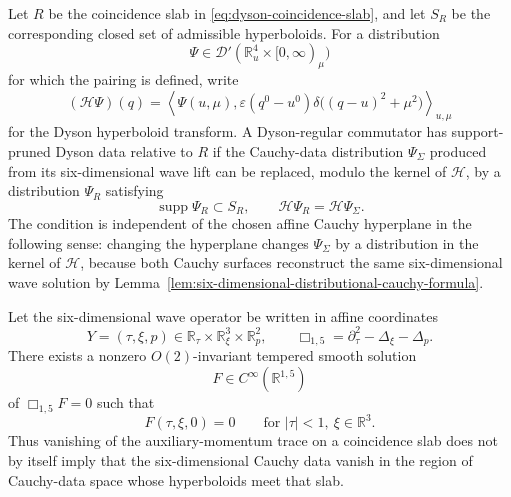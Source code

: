 \begin{definition}
\label{def:support-pruned-dyson-data}
Let \(R\) be the coincidence slab in
\eqref{eq:dyson-coincidence-slab}, and let \(S_R\) be the corresponding
closed set of admissible hyperboloids.  For a distribution
\[
  \Psi\in\mathcal D'(\mathbb R^4_u\times[0,\infty)_\mu)
\]
for which the pairing is defined, write
\begin{equation}
  (\mathcal H\Psi)(q)
  =
  \left\langle
    \Psi(u,\mu),
    \varepsilon(q^0-u^0)
    \delta\!\bigl((q-u)^2+\mu^2\bigr)
  \right\rangle_{u,\mu}
  \label{eq:dyson-hyperboloid-transform}
\end{equation}
for the Dyson hyperboloid transform.  A Dyson-regular commutator has
support-pruned Dyson data relative to \(R\) if the Cauchy-data distribution
\(\Psi_\Sigma\) produced from its six-dimensional wave lift can be replaced,
modulo the kernel of \(\mathcal H\), by a distribution \(\Psi_R\) satisfying
\begin{equation}
  \operatorname{supp}\Psi_R\subset S_R,
  \qquad
  \mathcal H\Psi_R=\mathcal H\Psi_\Sigma .
  \label{eq:support-pruned-dyson-data}
\end{equation}
The condition is independent of the chosen affine Cauchy hyperplane in the
following sense: changing the hyperplane changes \(\Psi_\Sigma\) by a
distribution in the kernel of \(\mathcal H\), because both Cauchy surfaces
reconstruct the same six-dimensional wave solution by
Lemma~\ref{lem:six-dimensional-distributional-cauchy-formula}.
\end{definition}

\begin{proposition}
\label{prop:dyson-axis-trace-nonuniqueness}
Let the six-dimensional wave operator be written in affine coordinates
\[
  Y=(\tau,\xi,p)\in\mathbb R_\tau\times\mathbb R^3_\xi\times\mathbb R^2_p,
  \qquad
  \Box_{1,5}=\partial_\tau^2-\Delta_\xi-\Delta_p .
\]
There exists a nonzero \(O(2)\)-invariant tempered smooth solution
\[
  F\in C^\infty(\mathbb R^{1,5})
\]
of \(\Box_{1,5}F=0\) such that
\begin{equation}
  F(\tau,\xi,0)=0
  \qquad
  \text{for } |\tau|<1,\ \xi\in\mathbb R^3 .
  \label{eq:axis-trace-vanishing-example}
\end{equation}
Thus vanishing of the auxiliary-momentum trace on a coincidence slab does not
by itself imply that the six-dimensional Cauchy data vanish in the region of
Cauchy-data space whose hyperboloids meet that slab.
\end{proposition}

